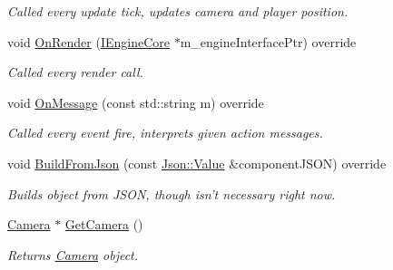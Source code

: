 \begin{DoxyCompactItemize}
\begin{DoxyCompactList}\small\item\em Called every update tick, updates camera and player position. \end{DoxyCompactList}\item 
\hypertarget{class_player_component_a09993dd0dc2edea3fccc08ec7d6a1d56}{void \hyperlink{class_player_component_a09993dd0dc2edea3fccc08ec7d6a1d56}{On\+Render} (\hyperlink{class_i_engine_core}{I\+Engine\+Core} $\ast$m\+\_\+engine\+Interface\+Ptr) override}\label{class_player_component_a09993dd0dc2edea3fccc08ec7d6a1d56}

\begin{DoxyCompactList}\small\item\em Called every render call. \end{DoxyCompactList}\item 
\hypertarget{class_player_component_abf177968c3355b3152eed62879a6cfe6}{void \hyperlink{class_player_component_abf177968c3355b3152eed62879a6cfe6}{On\+Message} (const std\+::string m) override}\label{class_player_component_abf177968c3355b3152eed62879a6cfe6}

\begin{DoxyCompactList}\small\item\em Called every event fire, interprets given action messages. \end{DoxyCompactList}\item 
\hypertarget{class_player_component_a683e8e6b11f8b26568d8c2c8f77fc4a6}{void \hyperlink{class_player_component_a683e8e6b11f8b26568d8c2c8f77fc4a6}{Build\+From\+Json} (const \hyperlink{class_json_1_1_value}{Json\+::\+Value} \&component\+J\+S\+O\+N) override}\label{class_player_component_a683e8e6b11f8b26568d8c2c8f77fc4a6}

\begin{DoxyCompactList}\small\item\em Builds object from J\+S\+O\+N, though isn't necessary right now. \end{DoxyCompactList}\item 
\hypertarget{class_player_component_ac69d2de4717b93332bd3e52fac29eab7}{\hyperlink{class_camera}{Camera} $\ast$ \hyperlink{class_player_component_ac69d2de4717b93332bd3e52fac29eab7}{Get\+Camera} ()}\label{class_player_component_ac69d2de4717b93332bd3e52fac29eab7}

\begin{DoxyCompactList}\small\item\em Returns \hyperlink{class_camera}{Camera} object. \end{DoxyCompactList}\end{DoxyCompactItemize}
